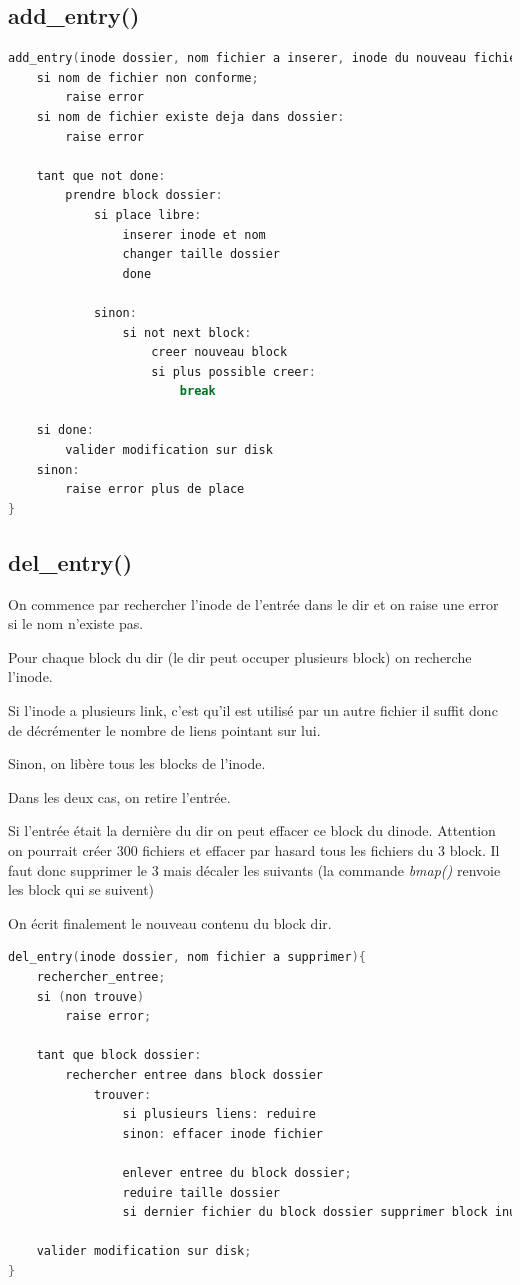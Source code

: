 \documentclass[a4paper,12pt]{article}
\begin{document}
\subsection{add\_entry()}

\begin{lstlisting}[language=C, caption=pseudo code add\_entry()]
add_entry(inode dossier, nom fichier a inserer, inode du nouveau fichier){
	si nom de fichier non conforme;
		raise error
	si nom de fichier existe deja dans dossier:
		raise error
		
	tant que not done:
		prendre block dossier:
			si place libre:
				inserer inode et nom
				changer taille dossier
				done

			sinon:
				si not next block:
					creer nouveau block
					si plus possible creer:
						break
						
	si done:
		valider modification sur disk
	sinon:
		raise error plus de place
}
\end{lstlisting}

\subsection{del\_entry()}

On commence par rechercher l'inode de l'entrée dans le dir et on raise une error si le nom n'existe pas.

Pour chaque block du dir (le dir peut occuper plusieurs block) on recherche l'inode.

Si l'inode a plusieurs link, c'est qu'il est utilisé par un autre fichier il suffit donc de décrémenter le nombre de liens pointant sur lui.

Sinon, on libère tous les blocks de l'inode.

Dans les deux cas, on retire l'entrée.

Si l'entrée était la dernière du dir on peut effacer ce block du dinode. Attention on pourrait créer 300 fichiers et effacer par hasard tous les fichiers du 3 block. Il faut donc supprimer le 3 mais décaler les suivants (la commande \emph{bmap()} renvoie les block qui se suivent)

On écrit finalement le nouveau contenu du block dir.

\begin{lstlisting}[language=C, caption=pseudo code del\_entry()]
del_entry(inode dossier, nom fichier a supprimer){
	rechercher_entree;
	si (non trouve)
		raise error;

	tant que block dossier:
		rechercher entree dans block dossier
			trouver:
				si plusieurs liens: reduire
				sinon: effacer inode fichier
			
				enlever entree du block dossier;
				reduire taille dossier
				si dernier fichier du block dossier supprimer block inutile;
	
	valider modification sur disk;
}
\end{lstlisting}
\end{document}
